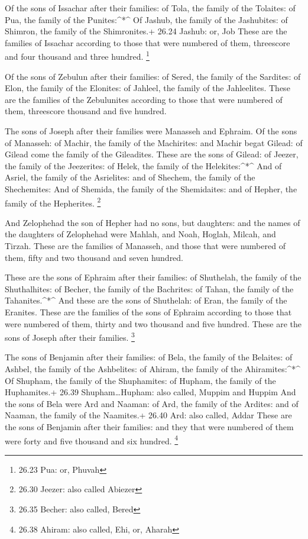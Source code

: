  Of the sons of Issachar after their families: of Tola, the
family of the Tolaites: of Pua, the family of the Punites:\^{}*\^{}
 Of Jashub, the family of the Jashubites: of Shimron, the
family of the Shimronites.+ 26.24 Jashub: or, Job  These
are the families of Issachar according to those that were numbered of
them, threescore and four thousand and three hundred. \footnote{26.23
  Pua: or, Phuvah}

 Of the sons of Zebulun after their families: of Sered, the
family of the Sardites: of Elon, the family of the Elonites: of Jahleel,
the family of the Jahleelites.  These are the families of
the Zebulunites according to those that were numbered of them,
threescore thousand and five hundred.

 The sons of Joseph after their families were Manasseh and
Ephraim.  Of the sons of Manasseh: of Machir, the family of
the Machirites: and Machir begat Gilead: of Gilead come the family of
the Gileadites.  These are the sons of Gilead: of Jeezer,
the family of the Jeezerites: of Helek, the family of the
Helekites:\^{}*\^{}  And of Asriel, the family of the
Asrielites: and of Shechem, the family of the Shechemites: 
And of Shemida, the family of the Shemidaites: and of Hepher, the family
of the Hepherites. \footnote{26.30 Jeezer: also called Abiezer}

 And Zelophehad the son of Hepher had no sons, but
daughters: and the names of the daughters of Zelophehad were Mahlah, and
Noah, Hoglah, Milcah, and Tirzah.  These are the families
of Manasseh, and those that were numbered of them, fifty and two
thousand and seven hundred.

 These are the sons of Ephraim after their families: of
Shuthelah, the family of the Shuthalhites: of Becher, the family of the
Bachrites: of Tahan, the family of the Tahanites.\^{}*\^{} 
And these are the sons of Shuthelah: of Eran, the family of the
Eranites.  These are the families of the sons of Ephraim
according to those that were numbered of them, thirty and two thousand
and five hundred. These are the sons of Joseph after their families.
\footnote{26.35 Becher: also called, Bered}

 The sons of Benjamin after their families: of Bela, the
family of the Belaites: of Ashbel, the family of the Ashbelites: of
Ahiram, the family of the Ahiramites:\^{}*\^{}  Of Shupham,
the family of the Shuphamites: of Hupham, the family of the Huphamites.+
26.39 Shupham\ldots Hupham: also called, Muppim and Huppim 
And the sons of Bela were Ard and Naaman: of Ard, the family of the
Ardites: and of Naaman, the family of the Naamites.+ 26.40 Ard: also
called, Addar  These are the sons of Benjamin after their
families: and they that were numbered of them were forty and five
thousand and six hundred. \footnote{26.38 Ahiram: also called, Ehi, or,
  Aharah}

